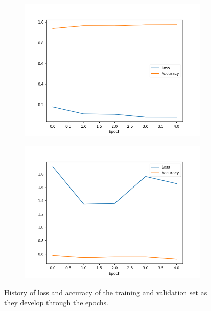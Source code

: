 \documentclass[../main.tex]{subfiles}
\begin{document}
\begin{figure}[H]
    \begin{subfigure}{.5\textwidth}
        \centering
        \includegraphics[width=1.1\linewidth]{doc/assets/facemasks_train_history.png}
    \end{subfigure}
    \begin{subfigure}{.5\textwidth}
        \centering
        \includegraphics[width=1.1\linewidth]{doc/assets/facemasks_val_history.png}
    \end{subfigure}
    \caption{History of loss and accuracy of the training and validation set as they develop through the epochs.}
    \label{fig:facemasks_cnn_history}
\end{figure}
\end{document}
